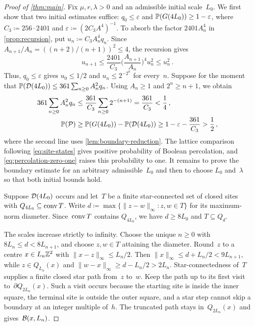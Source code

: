 \documentclass[11pt,letterpaper]{article}
\begin{document}
\begin{proof}[Proof of \cref{thm:main}]
Fix $\mu,r,\lambda>0$ and an admissible initial scale~$L_0$. We first show that two initial estimates suffice: $q_0\le\varepsilon$ and $\P(G(4L_0))\ge1-\varepsilon$, where $C_3\coloneqq256\cdot2401$ and $\varepsilon\coloneqq(2C_3A^4)^{-1}$. To absorb the factor $2401A_n^4$ in \cref{prop:recursion}, put $u_n\coloneqq C_3A_n^4q_n$. Since $A_{n+1}/A_n=((n+2)/(n+1))^2\le4$, the recursion gives
\begin{equation}\label{eq:iterated-crossing-bound}
  u_{n+1}\le\frac{2401}{C_3}\biggl(\frac{A_{n+1}}{A_n}\biggr)^4 u_n^2\le u_n^2\,.
\end{equation}
Thus, $q_0\le\varepsilon$ gives $u_0\le1/2$ and $u_n\le2^{-2^n}$ for every~$n$. Suppose for the moment that $\P(\cD(4L_0))\le361\sum_{n\ge0}A_n^2q_n$. Using $A_n\ge1$ and $2^n\ge n+1$, we obtain
\begin{align*}
  361\sum_{n\ge0} A_n^2q_n
     &\le \frac{361}{C_3}\sum_{n\ge0}2^{-(n+1)}=\frac{361}{C_3}<\frac14\,,\\
  \P(\cP)&\ge\P(G(4L_0))-\P(\cD(4L_0))
           \ge1-\varepsilon-\frac{361}{C_3}>\frac12\,,
\end{align*}
where the second line uses \cref{lem:boundary-reduction}. The lattice comparison following \eqref{eq:site-states} gives positive probability of Boolean percolation, and \eqref{eq:percolation-zero-one} raises this probability to one. It remains to prove the boundary estimate for an arbitrary admissible~$L_0$ and then to choose $L_0$ and~$\lambda$ so that both initial bounds hold.

Suppose $\cD(4L_0)$ occurs and let~$T$ be a finite star-connected set of closed sites with $Q_{4L_0}\subseteq\conv T$. Write $d\coloneqq\max\{\lVert z-w\rVert_\infty\colon z,w\in T\}$ for its maximum-norm diameter. Since~$\conv T$ contains $Q_{4L_0}$, we have $d\ge8L_0$ and $T\subseteq Q_d$. 

The scales increase strictly to infinity. Choose the unique $n\ge0$ with $8L_n\le d<8L_{n+1}$, and choose $z,w\in T$ attaining the diameter. Round~$z$ to a centre $x\in L_n\Z^2$ with $\lVert x-z\rVert_\infty\le L_n/2$. Then $\lVert x\rVert_\infty\le d+L_n/2<9L_{n+1}$, while $z\in Q_{L_n}(x)$ and $\lVert w-x\rVert_\infty\ge d-L_n/2>2L_n$.
Star-connectedness of~$T$ supplies a finite closed star path from~$z$ to~$w$. Keep the path up to its first visit to~$\partial Q_{2L_n}(x)$. Such a visit occurs because the starting site is inside the inner square, the terminal site is outside the outer square, and a star step cannot skip a boundary at an integer multiple of~$h$. The truncated path stays in~$Q_{2L_n}(x)$ and gives~$\cB(x,L_n)$.


\end{proof}
\end{document}
